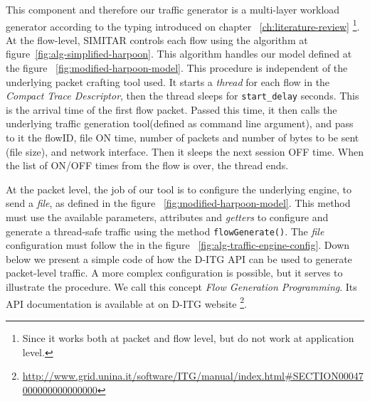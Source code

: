 This component and therefore our traffic generator is a multi-layer workload generator according to the typing introduced on chapter ~\ref{ch:literature-review} \footnote{Since it works both at packet and flow level, but do not work at application level.}. At the flow-level, SIMITAR controls each flow using the algorithm at figure~\ref{fig:alg-simplified-harpoon}. This algorithm handles our model defined at the figure ~\ref{fig:modified-harpoon-model}. This procedure is independent of the underlying packet crafting tool used. It starts a \textit{thread} for each flow in the \textit{Compact Trace Descriptor}, then the thread sleeps for \texttt{start\_delay} seconds. This is the arrival time of the first flow packet. Passed this time, it then calls the underlying traffic generation tool(defined as command line argument), and pass to it the flowID, file ON time, number of packets and number of bytes to be sent (file size), and network interface. Then it sleeps the next session OFF time. When the list of ON/OFF times from the flow is over, the thread ends. 


At the packet level, the job of our tool is to configure the underlying engine, to send a \textit{file}, as defined in the figure ~\ref{fig:modified-harpoon-model}. This method must use the available parameters, attributes and \textit{getters} to configure and generate a thread-safe traffic using the method \texttt{flowGenerate()}. The \textit{file} configuration must follow the in the figure ~\ref{fig:alg-traffic-engine-config}.  Down below we present a simple code of how the D-ITG API can be used to generate packet-level traffic. A more complex configuration is possible, but it serves to illustrate the procedure. We call this concept \textit{Flow Generation Programming}.  Its API documentation is available at on D-ITG website \footnote{\href{http://www.grid.unina.it/software/ITG/manual/index.html\#SECTION00047000000000000000}{http://www.grid.unina.it/software/ITG/manual/index.html\#SECTION00047000000000000000}}. 


